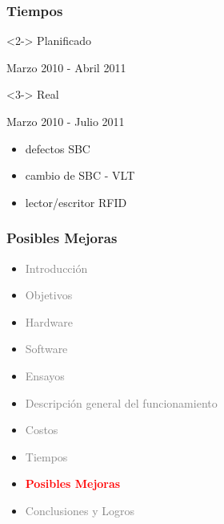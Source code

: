 \documentclass{beamer}
\begin{document}
\begin{frame}
	\frametitle{Tiempos}
	\begin{block} <2-> {Planificado}
		\begin{center}	
			Marzo 2010 - Abril 2011
		\end{center}	
	\end{block}
	
	
	\begin{block} <3-> {Real}
		\begin{center}	
			Marzo 2010 - Julio 2011
		\end{center}		
	\end{block}

	\bigskip
	\begin{itemize}
		\item <4-> defectos SBC
		
		\bigskip
		\item <5-> cambio de SBC - VLT
		
		\bigskip
		\item <6-> lector/escritor RFID
	\end{itemize}
	
\end{frame}
	
	
\begin{frame}
	\frametitle{Posibles Mejoras}
	\begin{itemize}
		\item \textcolor{gray}{Introducción}
		\item \textcolor{gray}{Objetivos}
		\item \textcolor{gray}{Hardware}
		\item \textcolor{gray}{Software}
		\item \textcolor{gray}{Ensayos}
		\item \textcolor{gray}{Descripción general del funcionamiento}		
		\item \textcolor{gray}{Costos}
		\item \textcolor{gray}{Tiempos}		
		\item \textcolor{red}{\bf{Posibles Mejoras}}
		\item \textcolor{gray}{Conclusiones y Logros}
	\end{itemize}
\end{frame}
\end{document}
